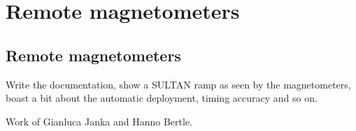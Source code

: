 \chapter{Remote magnetometers}
\label{ch:remote_magnetometers_appendix}

\section{Remote magnetometers}
Write the documentation, show a SULTAN ramp as seen by the magnetometers, boast a bit about the automatic deployment, timing accuracy and so on.

Work of Gianluca Janka and Hanno Bertle.